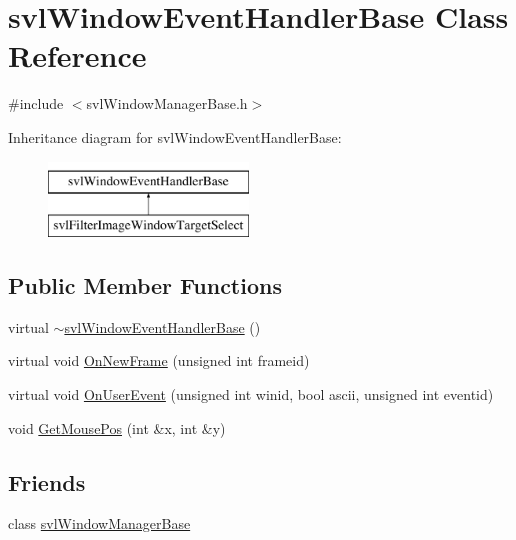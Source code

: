 \hypertarget{classsvl_window_event_handler_base}{\section{svl\-Window\-Event\-Handler\-Base Class Reference}
\label{classsvl_window_event_handler_base}
}


{\ttfamily \#include $<$svl\-Window\-Manager\-Base.\-h$>$}

Inheritance diagram for svl\-Window\-Event\-Handler\-Base\-:\begin{figure}[H]
\begin{center}
\leavevmode
\includegraphics[height=2.000000cm]{d9/d07/classsvl_window_event_handler_base}
\end{center}
\end{figure}
\subsection*{Public Member Functions}
\begin{DoxyCompactItemize}
\item 
virtual \hyperlink{classsvl_window_event_handler_base_a95391de3cdacf95ebc1272720f4b5ea2}{$\sim$svl\-Window\-Event\-Handler\-Base} ()
\item 
virtual void \hyperlink{classsvl_window_event_handler_base_ac7a48aa31c692aacd378f25394e0cc17}{On\-New\-Frame} (unsigned int frameid)
\item 
virtual void \hyperlink{classsvl_window_event_handler_base_a7979367a44c5e9b21e6b9f65b1a71ecb}{On\-User\-Event} (unsigned int winid, bool ascii, unsigned int eventid)
\item 
void \hyperlink{classsvl_window_event_handler_base_a44bac8fb1d07f55703accfe47a04a971}{Get\-Mouse\-Pos} (int \&x, int \&y)
\end{DoxyCompactItemize}
\subsection*{Friends}
\begin{DoxyCompactItemize}
\item 
class \hyperlink{classsvl_window_event_handler_base_a46aa18ca3dfcb3925b69fe97f8e1c54d}{svl\-Window\-Manager\-Base}
\end{DoxyCompactItemize}



